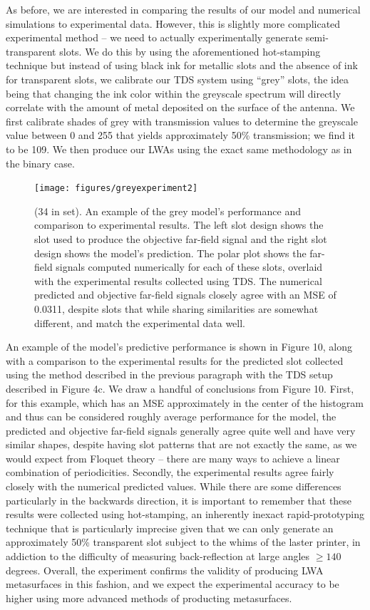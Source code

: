 \documentclass[11pt]{article}
\begin{document}
\noindent As before, we are interested in comparing the results of our model and numerical simulations to experimental data. However, this is slightly more complicated experimental method -- we need to actually experimentally generate semi-transparent slots. We do this by using the aforementioned hot-stamping technique but instead of using black ink for metallic slots and the absence of ink for transparent slots, we calibrate our TDS system using ``grey'' slots, the idea being that changing the ink color within the greyscale spectrum will directly correlate with the amount of metal deposited on the surface of the antenna. We first calibrate shades of grey with transmission values to determine the greyscale value between 0 and 255 that yields approximately 50\% transmission; we find it to be 109. We then produce our LWAs using the exact same methodology as in the binary case.

\begin{figure}[H]
	\centering
	\texttt{[image: figures/greyexperiment2]}
		\caption{(34 in set). An example of the grey model's performance and comparison to experimental results. The left slot design shows the slot used to produce the objective far-field signal and the right slot design shows the model's prediction. The polar plot shows the far-field signals computed numerically for each of these slots, overlaid with the experimental results collected using TDS. The numerical predicted and objective far-field signals closely agree with an MSE of 0.0311, despite slots that while sharing similarities are somewhat different, and match the experimental data well.}
\end{figure}

\noindent An example of the model's predictive performance is shown in Figure 10, along with a comparison to the experimental results for the predicted slot collected using the method described in the previous paragraph with the TDS setup described in Figure 4c. We draw a handful of conclusions from Figure 10. First, for this example, which has an MSE approximately in the center of the histogram and thus can be considered roughly average performance for the model, the predicted and objective far-field signals generally agree quite well and have very similar shapes, despite having slot patterns that are not exactly the same, as we would expect from Floquet theory -- there are many ways to achieve a linear combination of periodicities. Secondly, the experimental results agree fairly closely with the numerical predicted values. While there are some differences particularly in the backwards direction, it is important to remember that these results were collected using hot-stamping, an inherently inexact rapid-prototyping technique that is particularly imprecise given that we can only generate an approximately 50\% transparent slot subject to the whims of the laster printer, in addiction to the difficulty of measuring back-reflection at large angles $\geq 140$ degrees.  Overall, the experiment confirms the validity of producing LWA metasurfaces in this fashion, and we expect the experimental accuracy to be higher using more advanced methods of producting metasurfaces.
\end{document}
